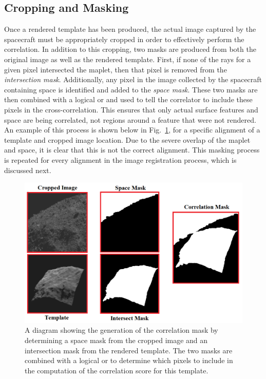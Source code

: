 \documentclass{src/RPI-SIW}
\begin{document}
\subsection*{Cropping and Masking}
Once a rendered template has been produced, the actual image captured by the spacecraft must be appropriately cropped in order to effectively perform the correlation.  In addition to this cropping, two masks are produced from both the original image as well as the rendered template.  First, if none of the rays for a given pixel intersected the maplet, then that pixel is removed from the \textit{intersection mask}.  Additionally, any pixel in the image collected by the spacecraft containing space is identified and added to the \textit{space mask}.  These two masks are then combined with a logical or and used to tell the correlator to include these pixels in the cross-correlation.  This ensures that only actual surface features and space are being correlated, not regions around a feature that were not rendered.  An example of this process is shown below in Fig.~\ref{figs::masks}, for a specific alignment of a template and cropped image location.  Due to the severe overlap of the maplet and space, it is clear that this is not the correct alignment.  This masking process is repeated for every alignment in the image registration process, which is discussed next.
\begin{figure}
	\centering
	\includegraphics[width=\columnwidth]{figs/masks.png}
	\caption{A diagram showing the generation of the correlation mask by determining a space mask from the cropped image and an intersection mask from the rendered template.  The two masks are combined with a logical or to determine which pixels to include in the computation of the correlation score for this template.}
	\label{figs::masks}
\end{figure}
\end{document}
